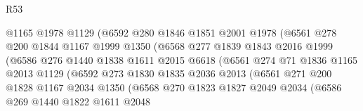\begin{lexlean}{R53}
\begin{coremodule}
                            @1165
                            @1978
                            @1129
                            (@6592
                              @280
                              @1846
                              @1851
                              @2001
                              @1978
                              (@6561
                                @278
                                @200
                                @1844
                                @1167
                                @1999
                                @1350
                                (@6568
                                  @277
                                  @1839
                                  @1843
                                  @2016
                                  @1999
                                  (@6586
                                    @276
                                    @1440
                                    @1838
                                    @1611
                                    @2015
                                    @6618
                                    (@6561
                                      @274
                                      @71
                                      @1836
                                      @1165
                                      @2013
                                      @1129
                                      (@6592
                                        @273
                                        @1830
                                        @1835
                                        @2036
                                        @2013
                                        (@6561
                                          @271
                                          @200
                                          @1828
                                          @1167
                                          @2034
                                          @1350
                                          (@6568
                                            @270
                                            @1823
                                            @1827
                                            @2049
                                            @2034
                                            (@6586
                                              @269
                                              @1440
                                              @1822
                                              @1611
                                              @2048

\end{coremodule}
\end{lexlean}
